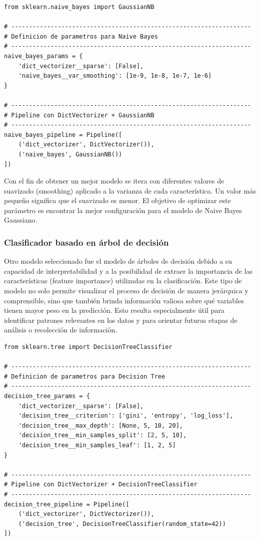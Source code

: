 \documentclass[11pt,a4paper,spanish]{book}
\numberwithin{equation}{chapter}
\numberwithin{figure}{chapter}
\begin{document}
\vspace{5mm}
\begin{lstlisting}
from sklearn.naive_bayes import GaussianNB

# -------------------------------------------------------------------
# Definicion de parametros para Naive Bayes
# -------------------------------------------------------------------
naive_bayes_params = {
    'dict_vectorizer__sparse': [False],
    'naive_bayes__var_smoothing': [1e-9, 1e-8, 1e-7, 1e-6]
}

# -------------------------------------------------------------------
# Pipeline con DictVectorizer + GaussianNB
# -------------------------------------------------------------------
naive_bayes_pipeline = Pipeline([
    ('dict_vectorizer', DictVectorizer()),
    ('naive_bayes', GaussianNB())
])
\end{lstlisting}


Con el fin de obtener un mejor modelo se itera con diferentes valores de suavizado 
(smoothing) aplicado a la varianza de cada característica. Un valor más pequeño 
significa que el suavizado es menor.  El objetivo de optimizar este parámetro es 
encontrar la mejor configuración para el modelo de Naive Bayes Gaussiano.


\subsubsection{Clasificador basado en árbol de decisión}

Otro modelo seleccionado fue el modelo de árboles de decisión debido a su capacidad de 
interpretabilidad y a la posibilidad de extraer la importancia de las características 
(feature importance) utilizadas en la clasificación. Este tipo de modelo no solo permite 
visualizar el proceso de decisión de manera jerárquica y comprensible, sino que también 
brinda información valiosa sobre qué variables tienen mayor peso en la predicción. 
Esto resulta especialmente útil para identificar patrones relevantes en los datos y 
para orientar futuras etapas de análisis o recolección de información.


\vspace{5mm}
\begin{lstlisting}
from sklearn.tree import DecisionTreeClassifier

# -------------------------------------------------------------------
# Definicion de parametros para Decision Tree
# -------------------------------------------------------------------
decision_tree_params = {
    'dict_vectorizer__sparse': [False],
    'decision_tree__criterion': ['gini', 'entropy', 'log_loss'],
    'decision_tree__max_depth': [None, 5, 10, 20],
    'decision_tree__min_samples_split': [2, 5, 10],
    'decision_tree__min_samples_leaf': [1, 2, 5]
}

# -------------------------------------------------------------------
# Pipeline con DictVectorizer + DecisionTreeClassifier
# -------------------------------------------------------------------
decision_tree_pipeline = Pipeline([
    ('dict_vectorizer', DictVectorizer()),
    ('decision_tree', DecisionTreeClassifier(random_state=42))
])
\end{lstlisting}
\end{document}
